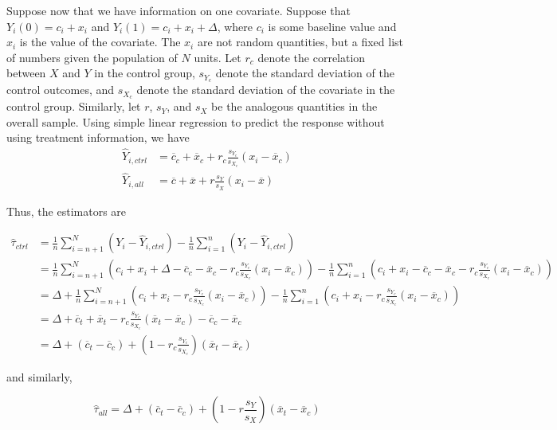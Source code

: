 \documentclass[12pt]{article}
\begin{document}
Suppose now that we have information on one covariate.  Suppose that $Y_i(0) = c_i + x_i$ and $Y_i(1) = c_i+x_i + \Delta$, where $c_i$ is some baseline value and $x_i$ is the value of the covariate.  The $x_i$ are not random quantities, but a fixed list of numbers given the population of $N$ units.  Let $r_c$ denote the correlation between $X$ and $Y$ in the control group, $s_{Y_c}$ denote the standard deviation of the control outcomes, and $s_{X_c}$ denote the standard deviation of the covariate in the control group.  Similarly, let $r$, $s_Y$, and $s_X$ be the analogous quantities in the overall sample.  Using simple linear regression to predict the response without using treatment information, we have
\begin{align*}
\hat{Y}_{i, ctrl} &= \overline{c}_c + \overline{x}_c + r_c \frac{s_{Y_c}}{s_{X_c}}(x_i - \overline{x}_c) \\
\hat{Y}_{i, all} &= \overline{c} + \overline{x} + r\frac{s_Y}{s_X}(x_i - \overline{x})
\end{align*}


Thus, the estimators are

\begin{align}
\hat{\tau}_{ctrl} &= \frac{1}{n}\sum_{i = n+1}^N (Y_i - \hat{Y}_{i, ctrl}) - \frac{1}{n}\sum_{i=1}^n (Y_i - \hat{Y}_{i, ctrl} ) \nonumber \\
&=  \frac{1}{n}\sum_{i = n+1}^N (c_i + x_i + \Delta - \overline{c}_c - \overline{x}_c - r_c \frac{s_{Y_c}}{s_{X_c}}(x_i - \overline{x}_c)) - \frac{1}{n}\sum_{i=1}^n (c_i + x_i - \overline{c}_c - \overline{x}_c - r_c \frac{s_{Y_c}}{s_{X_c}}(x_i - \overline{x}_c))  \nonumber \\
&= \Delta+  \frac{1}{n}\sum_{i = n+1}^N (c_i + x_i - r_c \frac{s_{Y_c}}{s_{X_c}}(x_i - \overline{x}_c)) - \frac{1}{n}\sum_{i=1}^n (c_i + x_i - r_c \frac{s_{Y_c}}{s_{X_c}}(x_i - \overline{x}_c))  \nonumber \\
&= \Delta + \overline{c}_t + \overline{x}_t - r_c \frac{s_{Y_c}}{s_{X_c}}(\overline{x}_t - \overline{x}_c) - \overline{c}_c - \overline{x}_c  \nonumber \\
&= \Delta + (\overline{c}_t - \overline{c}_c) + (1 - r_c \frac{s_{Y_c}}{s_{X_c}})(\overline{x}_t - \overline{x}_c)
\end{align}

and similarly,

\begin{equation}
\hat{\tau}_{all} = \Delta + (\overline{c}_t - \overline{c}_c) + (1 - r\frac{s_{Y}}{s_{X}})(\overline{x}_t - \overline{x}_c)
\end{equation}
\end{document}
